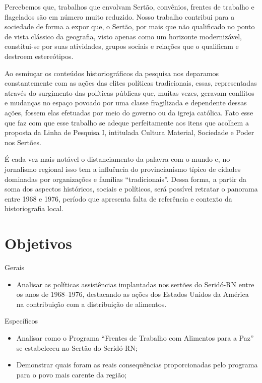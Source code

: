 \begin{refsection}
    Percebemos que, trabalhos que envolvam Sertão, convênios, frentes de trabalho e flagelados são em número muito reduzido. Nosso trabalho contribui para a sociedade de forma a expor que, o Sertão, por mais que não qualificado no ponto de vista clássico da geografia, visto apenas como um horizonte modernizável, constitui-se por suas atividades, grupos sociais e relações que o qualificam e destroem estereótipos. 

    Ao esmiuçar os conteúdos historiográficos da pesquisa nos deparamos constantemente com as ações das elites políticas tradicionais, essas, representadas através do surgimento das políticas públicas que, muitas vezes, geravam conflitos e mudanças no espaço povoado por uma classe fragilizada e dependente dessas ações, fossem elas efetuadas por meio do governo ou da igreja católica. Fato esse que faz com que esse trabalho se adeque perfeitamente aos itens que acolhem a proposta da Linha de Pesquisa I, intitulada Cultura Material, Sociedade e Poder nos Sertões. 

    É cada vez mais notável o distanciamento da palavra com o mundo e, no jornalismo regional isso tem a influência do provincianismo típico de cidades dominadas por organizações e famílias ``tradicionais''. Dessa forma, a partir da soma dos aspectos históricos, sociais e políticos, será possível retratar o panorama entre 1968 e 1976, período que apresenta falta de referência e contexto da historiografia local.

    \section{Objetivos}

    Gerais

    \begin{itemize}
        \item Analisar as políticas assistências implantadas nos sertões do Seridó-RN entre os anos de 1968--1976, destacando as ações dos Estados Unidos da América na contribuição com a distribuição de alimentos.
    \end{itemize}

    \noindent{}Específicos

    \begin{itemize}
        \item Analisar como o Programa ``Frentes de Trabalho com Alimentos para a Paz'' se estabeleceu no Sertão do Seridó-RN; 

        \item Demonstrar quais foram as reais consequências proporcionadas pelo programa para o povo mais carente da região; 
    

\end{itemize}
\end{refsection}

